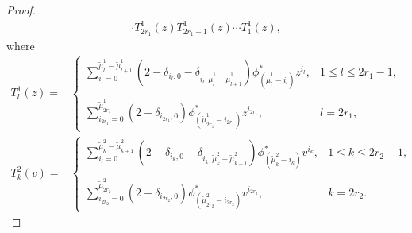 \documentclass[11pt,reqno]{amsart}
\numberwithin{equation}{section}
\begin{document}
\begin{proof}
\begin{align}
			\cdot	T_{2r_{1}}^{1}(z)T_{2r_{1}-1}^{1}(z) \cdots T_{1}^{1}(z),
		\end{align}
		where
		\begin{align}
			T_{l}^{1}(z)=&\left\{
			\begin{array}
				{ll}\sum\limits_{i_l=0}^{\tilde{\mu}^{1}_l-\tilde{\mu}^{1}_{l+1}}
				(2 - \delta_{i_{l},0}-\delta_{i_{l},\tilde{\mu}^{1}_{l}-\tilde{\mu}^{1}_{l+1}})
				\phi_{(\tilde{\mu}^{1}_{l}-i_{l})}^*  z^{i_{l}} , & 1 \leq l \leq 2r_{1}-1, \\
				\\
				\sum\limits_{i_{2r_{1}}=0}^{\tilde{\mu}^{1}_{2r_{1}}}  (2 - \delta_{i_{2r_{1}},0})
				\phi_{(\tilde{\mu}^{1}_{2r_{1}}-i_{2r_{1}})}^*  z^{i_{2r_{1}}},
				& l=2r_{1},
			\end{array}\right.\\
			T_{k}^{2}(v)=&\left\{
			\begin{array}
				{ll}\sum\limits_{i_l=0}^{\tilde{\mu}^{2}_k-\tilde{\mu}^{2}_{k+1}}
				(2 - \delta_{i_{k},0}-\delta_{i_{k},\tilde{\mu}^{2}_{k}-\tilde{\mu}^{2}_{k+1}})
				\phi_{(\tilde{\mu}^{2}_{k}-i_{k})}^*  v^{i_{k}} , & 1 \leq k \leq 2r_{2}-1, \\
				\\
				\sum\limits_{i_{2r_{2}}=0}^{\tilde{\mu}^{2}_{2r_{2}}}  (2 - \delta_{i_{2r_{2}},0})
				\phi_{(\tilde{\mu}^{2}_{2r_{2}}-i_{2r_{2}})}^*  v^{i_{2r_{2}}},
				& k=2r_{2}.
			\end{array}\right.
		\end{align}
		

\end{proof}
\end{document}
